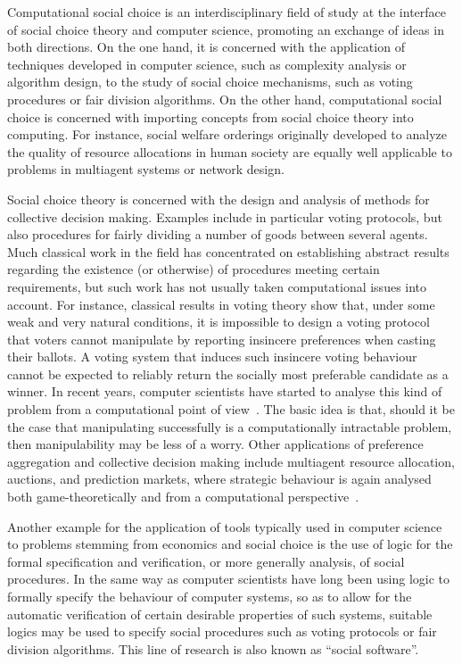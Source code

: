 \documentclass{comsoc2018}
\begin{document}
Computational social choice \cite{COMSOChandbook,bra-con-end:b:comsoc,pro:j:comsoc,ChevaleyreEtAlSOFSEM2007} is an 
interdisciplinary field of study at the interface of social choice theory 
and computer science, promoting an exchange of ideas in both directions. 
On the one hand, it is concerned with the application of techniques 
developed in computer science, such as complexity analysis or algorithm 
design, to the study of social choice mechanisms, such as voting procedures 
or fair division algorithms. On the other hand, computational social choice 
is concerned with importing concepts from social choice theory into computing. 
For instance, social welfare orderings originally developed to analyze the 
quality of resource allocations in human society are equally well applicable 
to problems in multiagent systems or network design.

Social choice theory is concerned with the design and analysis of methods for 
collective decision making. Examples include in particular voting protocols, 
but also procedures for fairly dividing a number of goods between several agents. 
Much classical work in the field has concentrated on establishing abstract 
results regarding the existence (or otherwise) of procedures meeting certain 
requirements, but such work has not usually taken computational issues into 
account. For instance, classical results in voting theory show that, under 
some weak and very natural conditions, it is impossible to design a voting 
protocol that voters cannot manipulate by reporting insincere preferences when 
casting their ballots. A voting system that induces such insincere voting 
behaviour cannot be expected to reliably return the socially most preferable 
candidate as a winner. In recent years, computer scientists have started to 
analyse this kind of problem from a computational point of 
view~\cite{fal-hem-hem-rot:b:richer,fal-hem-hem:j:cacm-survey,fal-pro:j:manipulation}. The basic 
idea is that, should it be the case that manipulating successfully is a 
computationally intractable problem, then manipulability may be less of a worry.
Other applications of preference aggregation and collective decision
making include multiagent resource allocation, auctions, and prediction
markets, where strategic behaviour is again analysed both game-theoretically
and from a computational perspective~\cite{con:j:making-decisions}.

Another example for the application of tools typically used in computer science 
to problems stemming from economics and social choice is the use of logic for 
the formal specification and verification, or more generally analysis, of 
social procedures. In the same way as computer scientists have long been using 
logic to formally specify the behaviour of computer systems, so as to allow for 
the automatic verification of certain desirable properties of such systems, 
suitable logics may be used to specify social procedures such as voting 
protocols or fair division algorithms. This line of research is also known 
as ``social software''.
\end{document}
